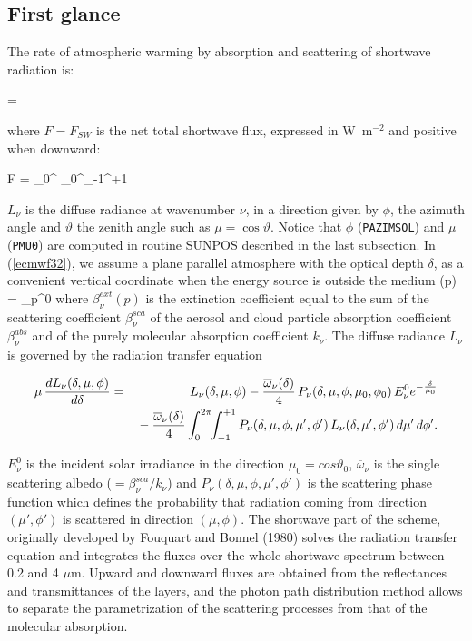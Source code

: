 %
\subsection{First glance}
%

The rate of atmospheric warming by absorption and scattering of shortwave radiation is:

%

\medskip
\be
{} =  
\label{ecmwf31}
\ee
\medskip

\noindent where $F=F_{SW}$ is the net total shortwave flux, expressed in
W~m$^{-2}$ and positive when downward:

\medskip
\be
F = \int_0^\infty{} \int_0^\pi{}\int_{-1}^{+1}
\label{ecmwf32}
\ee
\medskip

$L_{\nu}$ is the diffuse radiance at wavenumber $\nu$, in a direction given by $\phi$, the azimuth angle and $\vartheta $ the zenith angle such as $\mu =\cos\vartheta $. Notice that $\phi$ ({\tt PAZIMSOL}) and $\mu$ ({\tt PMU0}) are
computed in routine SUNPOS described in the last subsection. In (\ref{ecmwf32}),
we assume a plane parallel atmosphere with the optical depth $\delta$, as
a convenient vertical coordinate when the energy source is outside the medium
\medskip
\be
\delta(p) = \int_p^0
\label{ecmwf33}
\ee
\medskip
\noindent where $\beta_{\nu}^{ext}(p)$ is the extinction coefficient equal to
the sum of the scattering coefficient $\beta_{\nu}^{sca}$ of the aerosol and
cloud particle absorption coefficient $\beta_{\nu}^{abs}$ and of the purely molecular absorption coefficient $k_{\nu}$. The diffuse radiance $L_{\nu}$ is governed by the radiation transfer equation

\medskip
\begin{eqnarray}\label{ecmwf34}
\mu \, \frac{dL_{\nu}(\delta,\mu,\phi)}{d\delta} &=&
L_{\nu}(\delta,\mu,\phi) - \frac{\overline{\omega}_{\nu}(\delta)}{4} \, P_{\nu}(\delta,\mu,\phi,\mu_0,\phi_0) \, E_{\nu}^0 e^{-\frac{\delta}{\mu_0}} \cr
                                                 & &
\mbox{}- \frac{\overline{\omega}_{\nu}(\delta)}{4} \int_0^{2\pi}\!\!\int_{-1}^{+1}{P_{\nu}(\delta,\mu,\phi,\mu',\phi') \, L_{\nu}(\delta,\mu',\phi') \, d\mu' \, d\phi'}.
\end{eqnarray}
\medskip

$E_{\nu}^0$ is the incident solar irradiance in the direction $\mu_0 = cos\vartheta _0$, $\overline{\omega}_{\nu}$ is the single scattering albedo ($= \beta_{\nu}^{sca} / k_\nu$) and $P_{\nu}(\delta,\mu,\phi,\mu',\phi')$ is the scattering phase function which defines the probability that radiation coming from direction $(\mu',\phi')$ is scattered in direction $(\mu,\phi)$.
The shortwave part of the scheme, originally developed by Fouquart and Bonnel (1980) solves the radiation transfer equation and integrates the fluxes over the whole shortwave spectrum between 0.2 and 4 $\mu$m. Upward and downward fluxes are obtained from the reflectances and transmittances of the layers, and the photon path distribution method allows to separate the parametrization of the scattering processes from that of the molecular absorption.


